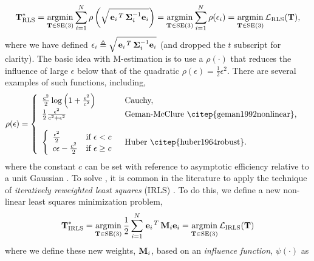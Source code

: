\begin{equation}
	\label{eq:vo_robust_loss_problem}
  \boldsymbol{\mathbf{T}}^*_{\text{RLS}} = \operatorname*{argmin}_{\boldsymbol{\mathbf{T}}\in\text{SE}(3)}\sum_{i=1}^{N} 
  \rho\left(\sqrt{\left.{\boldsymbol{\mathbf{e}}_{i}}\right.^T \boldsymbol{\mathbf{\Sigma}}_{i}^{-1} \boldsymbol{\mathbf{e}}_{i}}\right) = \operatorname*{argmin}_{\boldsymbol{\mathbf{T}}\in\text{SE}(3)}\sum_{i=1}^{N} 
  \rho(\epsilon_i) = \operatorname*{argmin}_{\boldsymbol{\mathbf{T}}\in\text{SE}(3)} \mathcal{L}_{\text{RLS}}(\boldsymbol{\mathbf{T}}),
\end{equation}
where we have defined $\epsilon_i \triangleq \sqrt{\left.{\boldsymbol{\mathbf{e}}_{i}}\right.^T \boldsymbol{\mathbf{\Sigma}}_{i}^{-1} \boldsymbol{\mathbf{e}}_{i}}$ (and dropped the $t$ subscript for clarity). The basic idea with M-estimation is to use a $\rho(\cdot)$ that reduces the influence of large $\epsilon$ below that of the quadratic $\rho(\epsilon) = \frac{1}{2} \epsilon^2$. There are several examples of such functions, including,
\begin{align}
\rho(\epsilon) &= \left\{  	\begin{array}{ll}
		 \frac{c^2}{2} \log{\left(1 + \frac{\epsilon^2}{c^2}\right)}   & \mbox{Cauchy,} \\
		 \frac{1}{2} \frac{\epsilon^2}{c^2 + \epsilon^2}  & \mbox{Geman-McClure \citep{geman1992nonlinear},} \\
		 \\
		\left\{  	\begin{array}{ll}  \frac{\epsilon^2}{2} & \mbox{if} ~\epsilon < c \\
										c\epsilon - \frac{c^2}{2} & \mbox{if} ~ \epsilon \geq c \end{array}
																						 \right.   & \mbox{Huber \citep{huber1964robust}.} \\
	\end{array}
	\right.
\end{align}
where the constant $c$ can be set with reference to asymptotic efficiency relative to a unit Gaussian \citep{Holland1977}. To solve , it is common in the literature to apply the technique of \textit{iteratively reweighted least squares} (IRLS) \citep{Holland1977}. To do this, we define a new non-linear least squares minimization problem,
\begin{equation}
\boldsymbol{\mathbf{T}}^*_{\text{IRLS}} = \operatorname*{argmin}_{\boldsymbol{\mathbf{T}}\in\text{SE}(3)}\frac{1}{2} \sum_{i=1}^{N} 
\left.{\boldsymbol{\mathbf{e}}_{i}}\right.^T \boldsymbol{\mathbf{M}}_{i} \boldsymbol{\mathbf{e}}_{i} = \operatorname*{argmin}_{\boldsymbol{\mathbf{T}}\in\text{SE}(3)} \mathcal{L}_{\text{IRLS}}(\boldsymbol{\mathbf{T}})
\end{equation}
where we define these new weights, $\boldsymbol{\mathbf{M}}_{i}$, based on an \textit{influence function}, $\psi(\cdot)$ as
